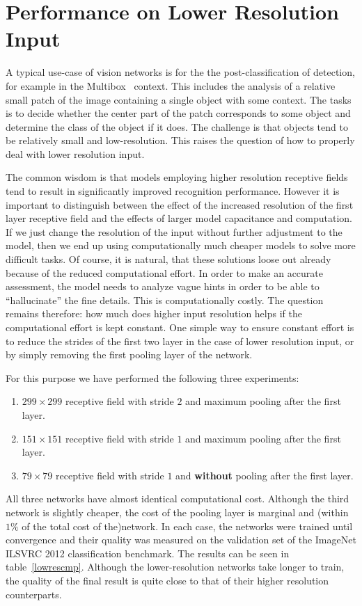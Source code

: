 \section{Performance on Lower Resolution Input}

A typical use-case of vision networks is for the the post-classification of
detection, for example in the Multibox~\cite{erhan2014scalable} context.
This includes
the analysis of a relative small patch of the image containing a single
object with some context. The tasks is to decide whether the center part
of the patch corresponds to some object and determine the class of the
object if it does. The challenge is that objects tend to be relatively
small and low-resolution. This raises the question of how to properly
deal with lower resolution input.

The common wisdom is that models employing higher resolution receptive
fields tend to result in significantly improved recognition performance.
However it is important to distinguish between the effect of the
increased resolution of the first layer receptive field and the
effects of larger model capacitance and computation.
If we just change the resolution of the input without further
adjustment to the model, then we end up using computationally much
cheaper models to solve more difficult tasks.
Of course, it is natural, that these solutions loose out already because of the
reduced computational effort. In order to make an accurate assessment,
the model needs to analyze vague hints in order to be able to
``hallucinate'' the fine details.
This is computationally costly. The question remains therefore: how
much does higher input resolution helps if the computational effort is
kept constant. One simple way to ensure constant effort is
to reduce the strides of the first two layer in the case of
lower resolution input, or by simply removing the first pooling layer of
the network.

For this purpose we have performed the following three experiments:
\begin{enumerate}
  \item $299\times 299$ receptive field with stride $2$ and maximum pooling
        after the first layer.
  \item $151\times 151$ receptive field with stride $1$ and maximum pooling
        after the first layer.
  \item $79\times 79$ receptive field with stride $1$ and {\bf without}
        pooling after the first layer.
\end{enumerate}
All three networks have almost identical computational cost. Although the third
network is slightly cheaper, the cost of the pooling layer is marginal
and (within $1\%$ of the total cost of the)network.
In each case, the networks were trained until convergence and their
quality was measured on the validation set of the ImageNet ILSVRC 2012
classification benchmark. The results can be seen in table~\ref{lowrescmp}.
Although the lower-resolution networks take longer to train,
the quality of the final result is quite close to that of their
higher resolution counterparts.

